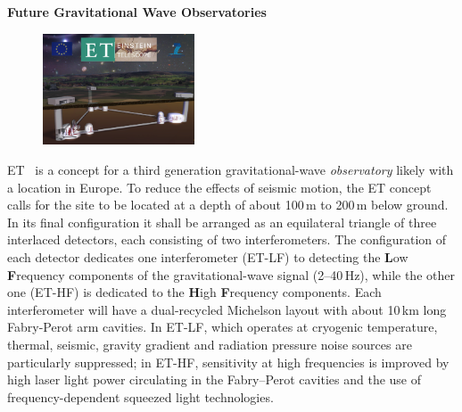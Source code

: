 \begin{DetBox}{\bf Future Gravitational Wave Observatories}
\label{Box:GWOs}
\begin{tcolorbox}[standard jigsaw,colback=amber!10!white,colframe=red!70!black,coltext=black,size=small,  title=The Einstein gravitational--wave Telescope (ET)] 
\begin{figure}
\vspace{-10pt}
\includegraphics*[width=0.4\textwidth]{Figures/ET_Thumb.png}
\label{fig:ET_Thumb}
\vspace{-25pt}
\end{figure}
ET~\cite{ET2011} is 
 a concept for a third generation gravitational-wave \emph{observatory}
 likely with a location in Europe. 
 To reduce the effects of seismic motion, the ET concept calls for the site to be located at a depth of about 100\,m to 200\,m below ground. In its final configuration it shall be arranged as an equilateral triangle of three interlaced detectors, each consisting of two interferometers. The configuration of each detector dedicates one interferometer (ET-LF) to detecting the \textbf{L}ow \textbf{F}requency components of the gravitational-wave signal (2--40\,Hz), while the other one (ET-HF) is dedicated to the \textbf{H}igh \textbf{F}requency components. Each interferometer will have a dual-recycled Michelson layout with about 10\,km long Fabry-Perot arm cavities. In ET-LF, which operates at cryogenic temperature, thermal, seismic, gravity gradient and radiation pressure noise sources are particularly suppressed; in ET-HF, sensitivity at high frequencies is improved by high laser light power circulating in the Fabry--Perot cavities and the use of frequency-dependent squeezed light technologies.
\end{tcolorbox}



\end{DetBox}

